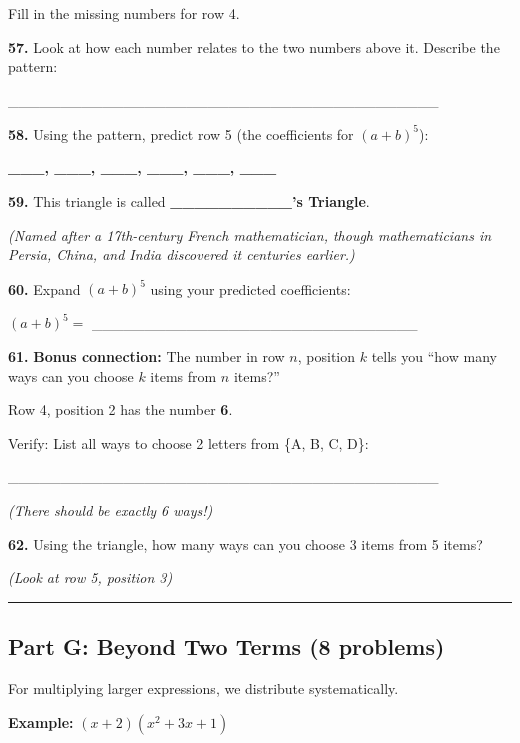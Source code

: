 \documentclass[
  11pt,
]{article}
\begin{document}
Fill in the missing numbers for row 4.

\textbf{57.} Look at how each number relates to the two numbers above
it. Describe the pattern:

\_\_\_\_\_\_\_\_\_\_\_\_\_\_\_\_\_\_\_\_\_\_\_\_\_\_\_\_\_\_\_\_\_\_\_\_\_\_\_\_\_

\textbf{58.} Using the pattern, predict row 5 (the coefficients for
\((a + b)^5\)):

\textbf{\_\_\_, \_\_\_, \_\_\_, \_\_\_, \_\_\_, \_\_\_}

\textbf{59.} This triangle is called \textbf{\_\_\_\_\_\_\_\_\_\_'s
Triangle}.

\emph{(Named after a 17th-century French mathematician, though
mathematicians in Persia, China, and India discovered it centuries
earlier.)}

\textbf{60.} Expand \((a + b)^5\) using your predicted coefficients:

\((a + b)^5 ={}\)
\_\_\_\_\_\_\_\_\_\_\_\_\_\_\_\_\_\_\_\_\_\_\_\_\_\_\_\_\_\_\_

\textbf{61.} \textbf{Bonus connection:} The number in row \(n\),
position \(k\) tells you ``how many ways can you choose \(k\) items from
\(n\) items?''

Row 4, position 2 has the number \textbf{6}.

Verify: List all ways to choose 2 letters from \{A, B, C, D\}:

\_\_\_\_\_\_\_\_\_\_\_\_\_\_\_\_\_\_\_\_\_\_\_\_\_\_\_\_\_\_\_\_\_\_\_\_\_\_\_\_\_

\emph{(There should be exactly 6 ways!)}

\textbf{62.} Using the triangle, how many ways can you choose 3 items
from 5 items?

\emph{(Look at row 5, position 3)}

\begin{center}\rule{0.5\linewidth}{0.5pt}\end{center}

\hypertarget{part-g-beyond-two-terms-8-problems}{%
\subsection{Part G: Beyond Two Terms (8
problems)}\label{part-g-beyond-two-terms-8-problems}}

For multiplying larger expressions, we distribute systematically.

\textbf{Example:} \((x + 2)(x^2 + 3x + 1)\)
\end{document}
